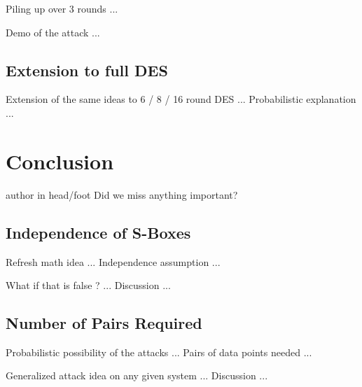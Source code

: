 \documentclass[9pt]{beamer}
\begin{document}
\begin{frame}
Piling up over 3 rounds ...

\end{frame}

\begin{frame}
Demo of the attack ...

\end{frame}

\subsection{Extension to full DES}
\begin{frame}
Extension of the same ideas to 6 / 8 / 16 round DES ... Probabilistic explanation ...

\end{frame}


\section{Conclusion}
\begin{frame}
\begin{beamercolorbox}[ht=2.5ex,dp=1.125ex,center,rounded=true,shadow=true]{author in head/foot}
Did we miss anything important?
\end{beamercolorbox}
\end{frame}

\subsection{Independence of S-Boxes}
\begin{frame}
Refresh math idea ... Independence assumption ...

\end{frame}

\begin{frame}
What if that is false ? ... Discussion ...

\end{frame}

\subsection{Number of Pairs Required}
\begin{frame}
Probabilistic possibility of the attacks ... Pairs of data points needed ...

\end{frame}

\begin{frame}
Generalized attack idea on any given system ... Discussion ...

\end{frame}
\end{document}
